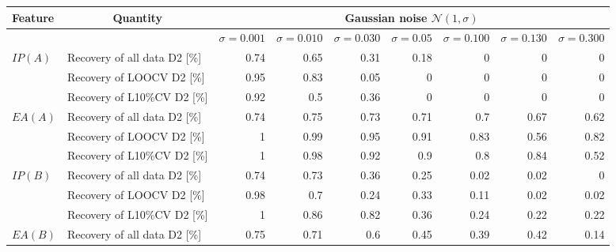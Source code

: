 \documentclass[11pt,oneside,czech,american]{book} %
\theoremstyle{plain}
\theoremstyle{definition}
\begin{document}
\begin{table}[H]
	\centering
	\scriptsize
	\begin{tabular}{llrrrrrrr} 
	\hline
	Feature                  & \multicolumn{1}{c}{Quantity} & \multicolumn{7}{c}{ Gaussian noise $\mathcal{N}(1,\sigma)$}                                                                \\ 
	\hline
	&                              & $\sigma = 0.001$ & $\sigma = 0.010$ & $\sigma = 0.030$ & $\sigma = 0.05$ & $\sigma = 0.100$ & $\sigma = 0.130$ & $\sigma = 0.300$  \\ 
	\hline
	\multirow{3}{*}{$IP(A)$}   & Recovery of all data D2 [\%] & 0.74          & 0.65          & 0.31          & 0.18         & 0             & 0             & 0              \\
	& Recovery of LOOCV D2 [\%]    & 0.95          & 0.83          & 0.05          & 0            & 0             & 0             & 0              \\
	& Recovery of L10\%CV D2 [\%]  & 0.92          & 0.5           & 0.36          & 0            & 0             & 0             & 0              \\ 
	\hline
	\multirow{3}{*}{$EA(A)$}   & Recovery of all data D2 [\%] & 0.74          & 0.75          & 0.73          & 0.71         & 0.7           & 0.67          & 0.62           \\
	& Recovery of LOOCV D2 [\%]    & 1             & 0.99          & 0.95          & 0.91         & 0.83          & 0.56          & 0.82           \\
	& Recovery of L10\%CV D2 [\%]  & 1             & 0.98          & 0.92          & 0.9          & 0.8           & 0.84          & 0.52           \\ 
	\hline
	\multirow{3}{*}{$IP(B)$}   & Recovery of all data D2 [\%] & 0.74          & 0.73          & 0.36          & 0.25         & 0.02          & 0.02          & 0              \\
	& Recovery of LOOCV D2 [\%]    & 0.98          & 0.7           & 0.24          & 0.33         & 0.11          & 0.02          & 0.02           \\
	& Recovery of L10\%CV D2 [\%]  & 1             & 0.86          & 0.82          & 0.36         & 0.24          & 0.22          & 0.22           \\ 
	\hline
	\multirow{3}{*}{$EA(B)$}   & Recovery of all data D2 [\%] & 0.75          & 0.71          & 0.6           & 0.45         & 0.39          & 0.42          & 0.14           \\

\end{tabular}
\end{table}
\end{document}
